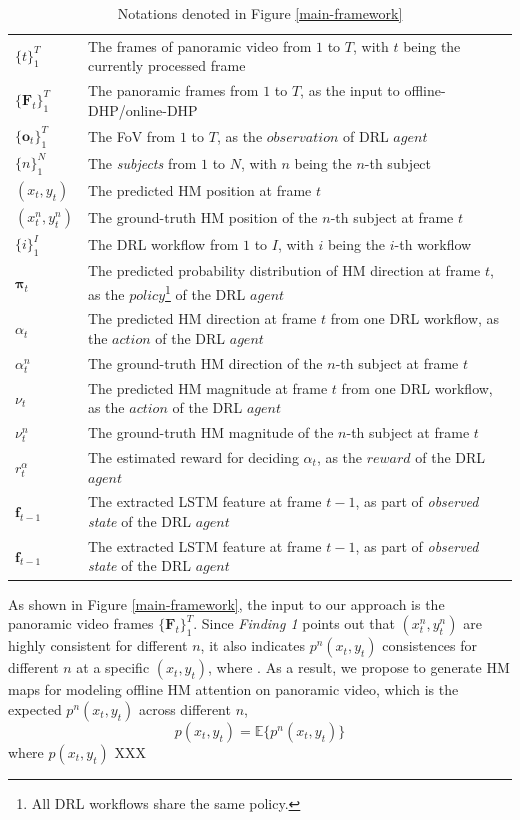 \documentclass[10pt,journal,compsoc]{IEEEtran}
\begin{document}
\begin{table}
\center
\caption{Notations denoted in Figure \ref{main-framework}} \label{notation_framework}
\begin{tabular}{ll}
$\{t\}_{1}^{T}$ & The frames of panoramic video from $1$ to $T$, with $t$ being the currently processed frame \\
$\{\mathbf{F}_t\}_1^{T}$ & The panoramic frames from $1$ to $T$, as the input to offline-DHP/online-DHP\\
$\{\mathbf{o}_t\}_1^{T}$ & The FoV from $1$ to $T$, as the $observation$ of DRL $agent$ \\
$\{n\}_{1}^{N}$ & The \textit{subjects} from $1$ to $N$, with $n$ being the $n$-th subject\\
$(x_t, y_t)$ & The predicted HM position at frame $t$ \\
$(x^n_t, y^n_t)$ & The ground-truth HM position of the $n$-th subject at frame $t$ \\
$\{i\}_{1}^{I}$ & The DRL workflow from $1$ to $I$, with $i$ being the $i$-th workflow \\
$\mathbf{\pi}_t$ & The predicted probability distribution of HM direction at frame $t$, as the $policy$\footnote{All DRL workflows share the same policy.} of the DRL $agent$ \\
$\alpha_t$ & The predicted HM direction at frame $t$ from one DRL workflow, as the $action$ of the DRL $agent$ \\
$\alpha^n_t$ & The ground-truth HM direction of the $n$-th subject at frame $t$ \\
$\nu_t$ & The predicted HM magnitude at frame $t$ from one DRL workflow, as the $action$ of the DRL $agent$ \\
$\nu^n_t$ & The ground-truth HM magnitude of the $n$-th subject at frame $t$ \\
$r^{\alpha}_t$ & The estimated reward for deciding $\alpha_t$, as the $reward$ of the DRL $agent$ \\
$\mathbf{f}_{t-1}$ & The extracted LSTM feature \cite{hausknecht2015deep} at frame $t-1$,  as part of \textit{observed state} of the DRL $agent$ \\
$\mathbf{f}_{t-1}$ & The extracted LSTM feature at frame $t-1$,  as part of \textit{observed state} of the DRL $agent$ \\
\end{tabular}
\end{table}




As shown in Figure \ref{main-framework}, the input to our approach is the panoramic video frames $\{\mathbf{F}_t\}_1^{T}$.
Since \textit{Finding 1} points out that $(x^n_t, y^n_t)$ are highly consistent for different $n$, it also indicates $p^n(x_t,y_t)$ consistences for different $n$ at a specific $(x_t,y_t)$, where . As a result, we propose to generate HM maps for modeling offline HM attention on panoramic video, which is the expected $p^n(x_t,y_t)$ across different $n$,
 \begin{equation}\label{define-hm-maps}
   p(x_t,y_t) = \mathbb{E}\{ p^n(x_t, y_t) \}
 \end{equation}
where $p(x_t,y_t)$ XXX
\end{document}
